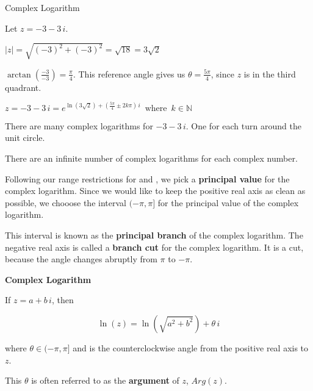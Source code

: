 \documentclass{ximera}
\begin{document}
\begin{example} Complex Logarithm


Let $z = -3 - 3 \, i$.


$|z| = \sqrt{(-3)^2 + (-3)^2} =  \sqrt{18} = 3 \sqrt{2}$


$\arctan\left(\frac{-3}{-3}\right) = \frac{\pi}{4}$.  This reference angle gives us $\theta = \frac{5 \pi}{4}$, since $z$ is in the third quadrant.




$z = -3 - 3 \, i =  e^{\ln(3 \sqrt{2}) + \left( \tfrac{5 \pi}{4} \pm 2 k \pi \right) \, i}     \, \text{ where } \, k \in \mathbb{N}  $


There are many complex logarithms for $-3 - 3 \, i$. One for each turn around the unit circle.



\end{example}




There are an infinite number of complex logarithms for each complex number.


Following our range restrictions for \arcsine and \arccosine, we pick a \textbf{principal value} for the complex logarithm. Since we would like to keep the positive real axis as clean as possible, we chooose the interval $(-\pi, \pi]$ for the principal value of the complex logarithm.

This interval is known as the \textbf{principal branch} of the complex logarithm.  The negative real axis is called a \textbf{branch cut} for the complex logarithm. It is a cut, because the angle changes abruptly from $\pi$ to $-\pi$.





\begin{definition}   \textbf{\textcolor{green!50!black}{Complex Logarithm}}
 
If $z = a + b \, i$, then 

\[   \ln(z) = \ln(\sqrt{a^2 + b^2}) + \theta \, i       \]



where $\theta \in (-\pi, \pi]$ and is the counterclockwise angle from the positive real axis to $z$.



This $\theta$ is often referred to as the \textbf{argument} of $z$, $Arg(z)$.



\end{definition}
\end{document}
